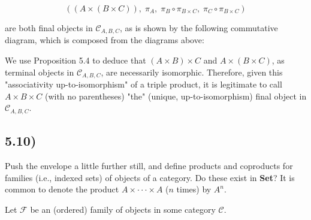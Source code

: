 \documentclass[12pt, letterpaper, twoside]{report}
\begin{document}
$$((A \times (B \times C)), \; \pi_A, \; \pi_B \circ \pi_{B \times C}, \; \pi_C \circ \pi_{B \times C})$$

are both final objects in $\mathcal{C}_{A,B,C}$, as is shown by the following commutative diagram, which is composed from the diagrams above:


We use Proposition 5.4 to deduce that $(A \times B) \times C$ and $A \times (B \times C)$, as terminal objects in $\mathcal{C}_{A,B,C}$, are necessarily isomorphic. Therefore, given this "associativity up-to-isomorphism" of a triple product, it is legitimate to call $A \times B \times C$ (with no parentheses) "the" (unique, up-to-isomorphism) final object in $\mathcal{C}_{A,B,C}$.


\subsection*{5.10)}

Push the envelope a little further still, and deﬁne products and coproducts for families (i.e., indexed sets) of objects of a category. Do these exist in \textbf{Set}? It is common to denote the product $A \times \cdot \cdot \cdot \times A$ ($n$ times) by $A^n$.

Let $\mathcal{F}$ be an (ordered) family of objects in some category $\mathcal{C}$.
\end{document}
